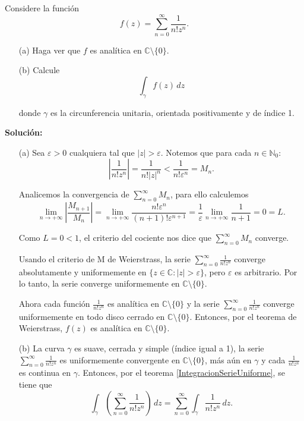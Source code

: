 \begin{ejemplo}[Certamen 2 (2020)]
Considere la función
$$f(z) = \sum_{n=0}^{\infty} \frac{1}{n! z^n}.$$

\begin{itemize}
    \item[(a)] Haga ver que $f$ es analítica en $\mathbb{C} \setminus \{0\}$.
    
    \item[(b)] Calcule
    $$\int_{\gamma} f(z) \,dz$$
    
    donde $\gamma$ es la circunferencia unitaria, orientada positivamente y de índice 1.
\end{itemize}

\textbf{Solución:}


\begin{itemize}
    \item[(a)] Sea $\varepsilon > 0$ cualquiera tal que $|z| > \varepsilon$. Notemos que para cada $n\in \mathbb{N}_0$:
    $$\left| \frac{1}{n! z^n} \right| = \frac{1}{n! |z|^n} < \frac{1}{n! \varepsilon^n} = M_n.$$
    
    Analicemos la convergencia de $\sum\limits_{n=0}^{\infty}M_n $, para ello calculemos
    $$\lim_{n\to + \infty} \left| \frac{M_{n+1}}{M_n}\right| = \lim_{n\to + \infty} \frac{n! \varepsilon^n}{(n+1)! \varepsilon^{n+1}} = \frac{1}{\varepsilon} \lim_{n\to + \infty} \frac{1}{n+1} = 0 = L.$$
    
    Como $L = 0 < 1$, el criterio del cociente nos dice que $\sum\limits_{n=0}^{\infty}M_n $ converge.
    
    Usando el criterio de M de Weierstrass, la serie $\sum\limits_{n=0}^{\infty} \frac{1}{n! z^n}$ converge absolutamente y uniformemente en $\{z \in \mathbb{C}: |z|> \varepsilon\}$, pero $\varepsilon$ es arbitrario. Por lo tanto, la serie converge uniformemente en $\mathbb{C} \setminus \{0\}$.
    
    Ahora cada función $\frac{1}{n! z^n}$ es analítica en $\mathbb{C} \setminus \{0\}$ y la serie $\sum\limits_{n=0}^{\infty} \frac{1}{n! z^n}$ converge uniformemente en todo disco cerrado en  $\mathbb{C} \setminus \{0\}$. Entonces, por el teorema de Weierstrass, $f(z)$ es analítica en $\mathbb{C} \setminus \{0\}$.
    
    \item[(b)] La curva $\gamma$ es suave, cerrada y simple (índice igual a 1), la serie $\sum\limits_{n=0}^{\infty} \frac{1}{n! z^n}$ es uniformemente convergente en $\mathbb{C} \setminus \{0\}$, más aún en $\gamma$ y cada $\frac{1}{n! z^n}$ es continua en $\gamma$. Entonces, por el teorema \ref{IntegracionSerieUniforme}, se tiene que
    $$\int_{\gamma} \left(\sum_{n=0}^{\infty} \frac{1}{n! z^n} \right) \,dz = \sum_{n=0}^{\infty} \int_{\gamma} \frac{1}{n! z^n} \,dz.$$
    

\end{itemize}
\end{ejemplo}
